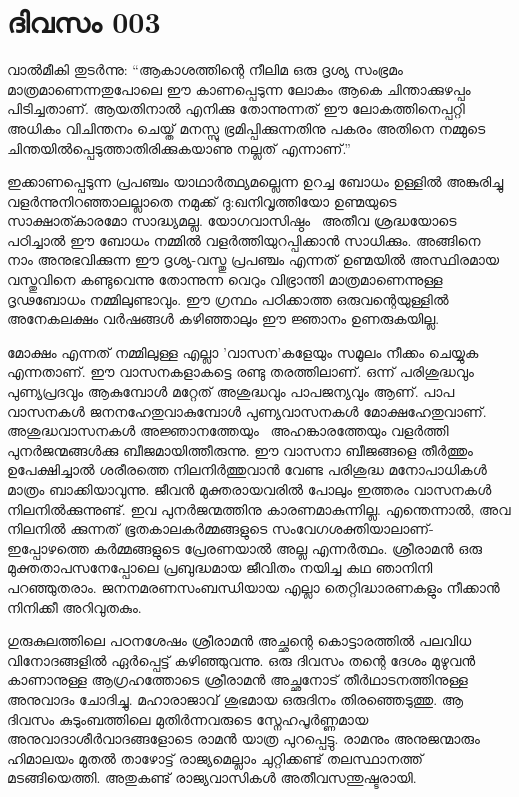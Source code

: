 \newpage
\section{ദിവസം 003}

വാല്‍മീകി തുടര്‍ന്നു: ``ആകാശത്തിന്റെ നീലിമ ഒരു ദൃശ്യ സംഭ്രമം
മാത്രമാണെന്നതുപോലെ ഈ കാണപ്പെടുന്ന ലോകം ആകെ ചിന്താക്കുഴപ്പം പിടിച്ചതാണ്‌.
ആയതിനാല്‍ എനിക്കു തോന്നുന്നത്‌ ഈ ലോകത്തിനെപ്പറ്റി അധികം വിചിന്തനം
ചെയ്ത്‌ മനസ്സു ഭ്രമിപ്പിക്കുന്നതിനു പകരം അതിനെ നമ്മുടെ
ചിന്തയില്‍പ്പെടുത്താതിരിക്കുകയാണു നല്ലത്‌ എന്നാണ്‌.''~

ഇക്കാണപ്പെടുന്ന പ്രപഞ്ചം യാഥാര്‍ത്ഥ്യമല്ലെന്ന ഉറച്ച ബോധം ഉള്ളില്‍
അങ്കുരിച്ചു വളര്‍ന്നുനിറഞ്ഞാലല്ലാതെ നമുക്ക്‌ ദു:ഖനിവൃത്തിയോ ഉണ്മയുടെ
സാക്ഷാത്കാരമോ സാദ്ധ്യമല്ല. യോഗവാസിഷ്ഠം ~അതീവ ശ്രദ്ധയോടെ പഠിച്ചാല്‍ ഈ
ബോധം നമ്മില്‍ വളര്‍ത്തിയുറപ്പിക്കാന്‍ സാധിക്കും. അങ്ങിനെ നാം
അനുഭവിക്കുന്ന ഈ ദൃശ്യ-വസ്തു പ്രപഞ്ചം എന്നത്‌ ഉണ്മയില്‍ അസ്ഥിരമായ
വസ്തുവിനെ കണ്ടുവെന്നു തോന്നുന്ന വെറും വിഭ്രാന്തി മാത്രമാണെന്നുള്ള
ദൃഢബോധം നമ്മിലുണ്ടാവും. ഈ ഗ്രന്ഥം പഠിക്കാത്ത ഒരുവന്റെയുള്ളില്‍ അനേകലക്ഷം
വര്‍ഷങ്ങള്‍ കഴിഞ്ഞാലും ഈ ജ്ഞാനം ഉണരുകയില്ല.

മോക്ഷം എന്നത്‌ നമ്മിലുള്ള എല്ലാ 'വാസന'കളേയും സമൂലം നീക്കം ചെയ്യുക
എന്നതാണ്‌. ഈ വാസനകളാകട്ടെ രണ്ടു തരത്തിലാണ്‌. ഒന്ന് പരിശുദ്ധവും
പുണ്യപ്രദവും ആകുമ്പോള്‍ മറ്റേത്‌ അശുദ്ധവും പാപജന്യവും ആണ്‌. പാപ വാസനകള്‍
ജനനഹേതുവാകുമ്പോള്‍ പുണ്യവാസനകള്‍ മോക്ഷഹേതുവാണ്‌. അശുദ്ധവാസനകള്‍
അജ്ഞാനത്തേയും ~അഹങ്കാരത്തേയും വളര്‍ത്തി പുനര്‍ജന്മങ്ങള്‍ക്കു
ബീജമായിത്തീരുന്നു. ഈ വാസനാ ബീജങ്ങളെ തീര്‍ത്തും ഉപേക്ഷിച്ചാല്‍ ശരീരത്തെ
നിലനിര്‍ത്തുവാന്‍ വേണ്ട പരിശുദ്ധ മനോപാധികള്‍ മാത്രം ബാക്കിയാവുന്നു.
ജീവന്‍ മുക്തരായവരില്‍ പോലും ഇത്തരം വാസനകള്‍ നിലനില്‍ക്കുന്നുണ്ട്‌. ഇവ
പുനര്‍ജന്മത്തിനു കാരണമാകുന്നില്ല. എന്തെന്നാല്‍, അവ നിലനില്‍ ക്കുന്നത്‌
ഭൂതകാലകര്‍മ്മങ്ങളുടെ സംവേഗശക്തിയാലാണ്‌- ഇപ്പോഴത്തെ കര്‍മ്മങ്ങളുടെ
പ്രേരണയാല്‍ അല്ല എന്നര്‍ത്ഥം. ശ്രീരാമന്‍ ഒരു മുക്തതാപസനേപ്പോലെ
പ്രബുദ്ധമായ ജീവിതം നയിച്ച കഥ ഞാനിനി പറഞ്ഞുതരാം. ജനനമരണസംബന്ധിയായ എല്ലാ
തെറ്റിദ്ധാരണകളും നീക്കാന്‍ നിനിക്കീ അറിവുതകും.~

ഗുരുകുലത്തിലെ പഠനശേഷം ശ്രീരാമന്‍ അച്ഛന്റെ കൊട്ടാരത്തില്‍ പലവിധ
വിനോദങ്ങളില്‍ ഏര്‍പ്പെട്ട്‌ കഴിഞ്ഞുവന്നു. ഒരു ദിവസം തന്റെ ദേശം മുഴുവന്‍
കാണാനുള്ള ആഗ്രഹത്തോടെ ശ്രീരാമന്‍ അച്ഛനോട്‌ തീര്‍ഥാടനത്തിനുള്ള അനുവാദം
ചോദിച്ചു. മഹാരാജാവ്‌ ശുഭമായ ഒരുദിനം തിരഞ്ഞെടുത്തു. ആ ദിവസം കുടുംബത്തിലെ
മുതിര്‍ന്നവരുടെ സ്നേഹപൂര്‍ണ്ണമായ അനുവാദാശീര്‍വാദങ്ങളോടെ രാമന്‍ യാത്ര
പുറപ്പെട്ടു. രാമനും അനുജന്മാരും ഹിമാലയം മുതല്‍ താഴോട്ട്‌ രാജ്യമെല്ലാം
ചുറ്റിക്കണ്ട്‌ തലസ്ഥാനത്ത്‌ മടങ്ങിയെത്തി. അതുകണ്ട്‌ രാജ്യവാസികള്‍
അതീവസന്തുഷ്ടരായി.
